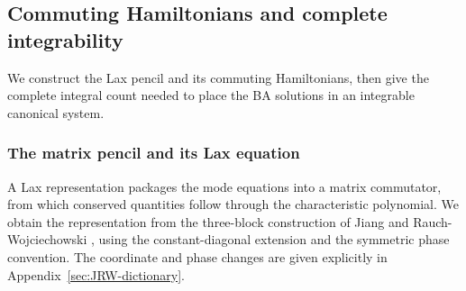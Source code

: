 \subsection{Commuting Hamiltonians and complete integrability}
\label{sec:canonical-integrable-framework}

We construct the Lax pencil and its commuting Hamiltonians, then give
the complete integral count needed to place the BA solutions in an
integrable canonical system.

\subsubsection{The matrix pencil and its Lax equation}
\label{sec:canonical-lax}

A Lax representation packages the mode equations into a matrix
commutator, from which conserved quantities follow through the
characteristic polynomial. We obtain the representation from the
three-block construction of Jiang and Rauch-Wojciechowski
\cite[equation (2.7)]{JRW1991}, using the constant-diagonal extension
and the symmetric phase convention. The coordinate and phase changes
are given explicitly in Appendix~\ref{sec:JRW-dictionary}.

